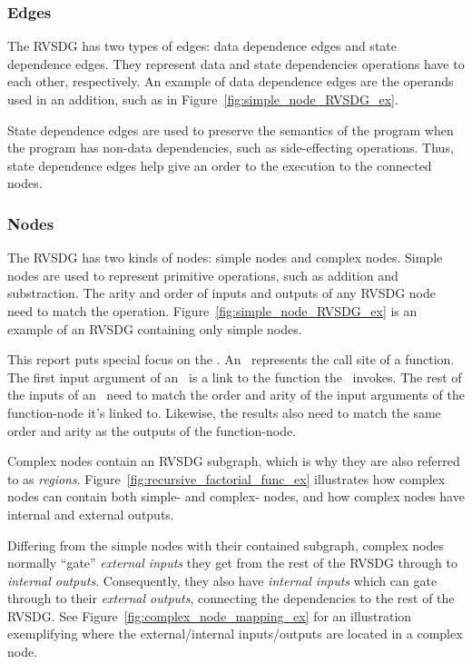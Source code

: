\subsubsection{Edges}

The RVSDG has two types of edges: data dependence edges and state dependence
edges. They represent data and state dependencies operations have to each other,
respectively. An example of data dependence edges are the operands used in an
addition, such as in Figure~\ref{fig:simple_node_RVSDG_ex}.

State dependence edges are used to preserve the semantics of the program when
the program has non-data dependencies, such as side-effecting operations. Thus,
state dependence edges help give an order to the execution to the connected
nodes.

\subsubsection{Nodes}

The RVSDG has two kinds of nodes: simple nodes and complex nodes. Simple nodes
are used to represent primitive operations, such as addition and substraction.
The arity and order of inputs and outputs of any RVSDG node need to match the
operation. Figure~\ref{fig:simple_node_RVSDG_ex} is an example of an RVSDG
containing only simple nodes.

This report puts special focus on the \applyNode . An \applyNode~represents the
call site of a function. The first input argument of an \applyNode~is a link to
the function the \applyNode~invokes. The rest of the inputs of an
\applyNode~need to match the order and arity of the input arguments of the
function-node it's linked to. Likewise, the results also need to match the same
order and arity as the outputs of the function-node.

Complex nodes contain an RVSDG subgraph, which is why they are also referred to
as \textit{regions}. Figure~\ref{fig:recursive_factorial_func_ex} illustrates
how complex nodes can contain both simple- and complex- nodes, and how complex
nodes have internal and external outputs.

Differing from the simple nodes with their contained subgraph, complex nodes
normally ``gate'' \textit{external inputs} they get from the rest of the RVSDG
through to \textit{internal outputs}. Consequently, they also have
\textit{internal inputs} which can gate through to their \textit{external
outputs}, connecting the dependencies to the rest of the RVSDG. See
Figure~\ref{fig:complex_node_mapping_ex} for an illustration exemplifying where
the external/internal inputs/outputs are located in a complex node.

